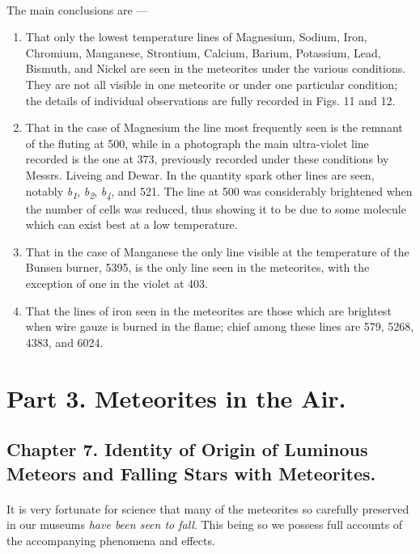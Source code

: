 \documentclass[a4paper, 12pt, oneside, polutonikogreek, english]{article}
\begin{document}
\paragraph{}
The main conclusions are ---
\begin{enumerate}
    \item That only the lowest temperature lines of Magnesium, Sodium, Iron, Chromium, Manganese, Strontium, Calcium, Barium, Potassium, Lead, Bismuth, and Nickel are seen in the meteorites under the various conditions. They are not all visible in one meteorite or under one particular condition; the details of individual observations are fully recorded in Figs. 11 and 12.
    \item That in the case of Magnesium the line most frequently seen is the remnant of the fluting at 500, while in a photograph the main ultra-violet line recorded is the one at 373, previously recorded under these conditions by Messrs. Liveing and Dewar. In the quantity spark other lines are seen, notably \emph{b\textsubscript{1}}, \emph{b\textsubscript{2}}, \emph{b\textsubscript{4}}, and 521. The line at 500 was considerably brightened when the number of cells was reduced, thus showing it to be due to some molecule which can exist best at a low temperature.
    \item That in the case of Manganese the only line visible at the temperature of the Bunsen burner, 5395, is the only line seen in the meteorites, with the exception of one in the violet at 403.
    \item That the lines of iron seen in the meteorites are those which are brightest when wire gauze is burned in the flame; chief among these lines are 579, 5268, 4383, and 6024.
\end{enumerate}
\clearpage
\section{Part 3. Meteorites in the Air.}
\subsection{Chapter 7. Identity of Origin of Luminous Meteors and Falling Stars with Meteorites.}
\paragraph{}
It is very fortunate for science that many of the meteorites so carefully preserved in our museums \emph{have been seen to fall}. This being so we possess full accounts of the accompanying phenomena and effects.
\end{document}
